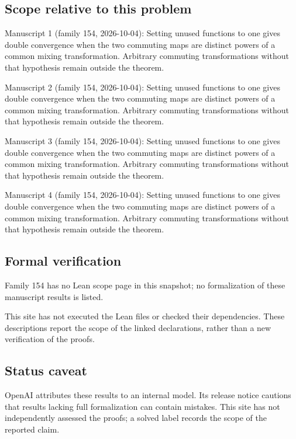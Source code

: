 \documentclass[11pt]{article}
\begin{document}
\subsection{Scope relative to this problem}
Manuscript 1 (family 154, 2026-10-04): Setting unused functions to one gives double convergence when the two commuting maps are distinct powers of a common mixing transformation. Arbitrary commuting transformations without that hypothesis remain outside the theorem.

Manuscript 2 (family 154, 2026-10-04): Setting unused functions to one gives double convergence when the two commuting maps are distinct powers of a common mixing transformation. Arbitrary commuting transformations without that hypothesis remain outside the theorem.

Manuscript 3 (family 154, 2026-10-04): Setting unused functions to one gives double convergence when the two commuting maps are distinct powers of a common mixing transformation. Arbitrary commuting transformations without that hypothesis remain outside the theorem.

Manuscript 4 (family 154, 2026-10-04): Setting unused functions to one gives double convergence when the two commuting maps are distinct powers of a common mixing transformation. Arbitrary commuting transformations without that hypothesis remain outside the theorem.

\subsection{Formal verification}
Family 154 has no Lean scope page in this snapshot; no formalization of these manuscript results is listed.

This site has not executed the Lean files or checked their dependencies. These descriptions report the scope of the linked declarations, rather than a new verification of the proofs.

\subsection{Status caveat}
OpenAI attributes these results to an internal model. Its release notice cautions that results lacking full formalization can contain mistakes. This site has not independently assessed the proofs; a solved label records the scope of the reported claim.
\end{document}
